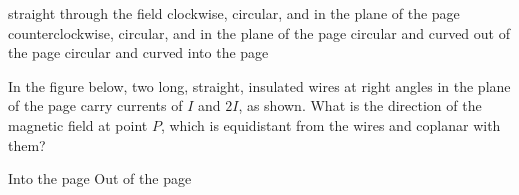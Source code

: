 \documentclass[12pt]{../oss-classkick-exam}
\begin{document}
\begin{questions}
  \vspace{.1in}
  \begin{minipage}{.4\linewidth}
  \end{minipage}
  \begin{minipage}{.55\linewidth}
    \begin{choices}
      \choice straight through the field
      \choice clockwise, circular, and in the plane of the page
      \choice counterclockwise, circular, and in the plane of the page
      \choice circular and curved out of the page
      \choice circular and curved into the page
    \end{choices}
  \end{minipage}
  \vspace{.6in}
  
  \uplevel{ \rule{\linewidth}{.5pt}}

  \question In the figure below, two long, straight, insulated wires at right
  angles in the plane of the page carry currents of $I$ and $2I$, as shown.
  What is the direction of the magnetic field at point $P$, which is
  equidistant from the wires and coplanar with them?

  \begin{minipage}{.35\linewidth}
  \end{minipage}
  \begin{minipage}{.4\linewidth}
    \begin{choices}
      \choice Into the page
      \choice Out of the page
      \choice {\huge$\searrow$}
      \choice {\huge$\nwarrow$}
      \choice {\huge$\nearrow$}
    \end{choices}
  \end{minipage}
  

\end{questions}
\end{document}
